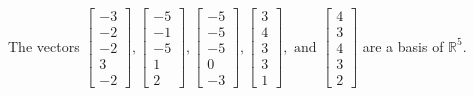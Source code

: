 \begin{exercise}
\begin{exerciseStatement}
  \end{exerciseStatement}
  \begin{exerciseAnswer}
   The vectors \(\left[\begin{array}{r}
-3 \\
-2 \\
-2 \\
3 \\
-2
\end{array}\right] , \left[\begin{array}{r}
-5 \\
-1 \\
-5 \\
1 \\
2
\end{array}\right] , \left[\begin{array}{r}
-5 \\
-5 \\
-5 \\
0 \\
-3
\end{array}\right] , \left[\begin{array}{r}
3 \\
4 \\
3 \\
3 \\
1
\end{array}\right] , \text{ and } \left[\begin{array}{r}
4 \\
3 \\
4 \\
3 \\
2
\end{array}\right]\) 
  	 are  a basis of \(\mathbb{R}^5\).
  


  \end{exerciseAnswer}
\end{exercise}